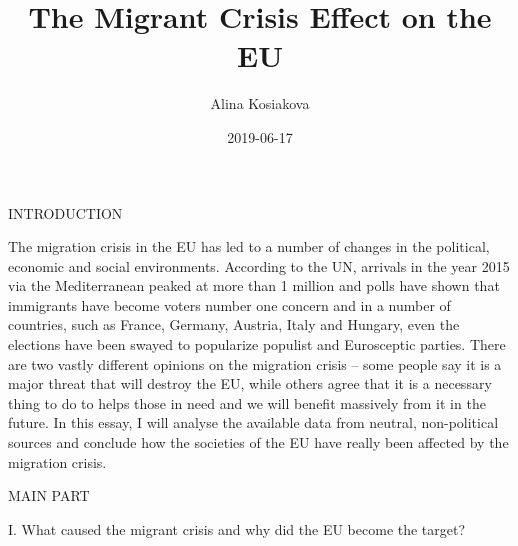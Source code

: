 \documentclass[]{article}
\title{The Migrant Crisis Effect on the EU}
\author{Alina Kosiakova}
\date{2019-06-17}
\begin{document}
\maketitle

INTRODUCTION

The migration crisis in the EU has led to a number of changes in the
political, economic and social environments. According to the UN,
arrivals in the year 2015 via the Mediterranean peaked at more than 1
million and polls have shown that immigrants have become voters number
one concern and in a number of countries, such as France, Germany,
Austria, Italy and Hungary, even the elections have been swayed to
popularize populist and Eurosceptic parties. There are two vastly
different opinions on the migration crisis -- some people say it is a
major threat that will destroy the EU, while others agree that it is a
necessary thing to do to helps those in need and we will benefit
massively from it in the future. In this essay, I will analyse the
available data from neutral, non-political sources and conclude how the
societies of the EU have really been affected by the migration crisis.

MAIN PART

I. What caused the migrant crisis and why did the EU become the target?
\end{document}
